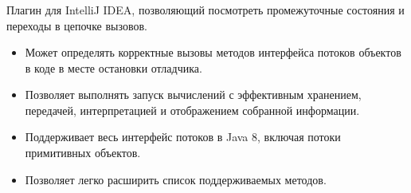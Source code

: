 \begin{frame}
\frametitle{\insertsection} 
\framesubtitle{\insertsubsection}
Плагин для IntelliJ IDEA, позволяющий посмотреть промежуточные состояния и переходы в цепочке вызовов. 
\begin{itemize}
	\item Может определять корректные вызовы методов интерфейса потоков объектов в коде в месте остановки отладчика.
	\item Позволяет выполнять запуск вычислений с эффективным хранением, передачей, интерпретацией и отображением собранной информации.
	\item Поддерживает весь интерфейс потоков в Java 8, включая потоки примитивных объектов.
	\item Позволяет легко расширить список поддерживаемых методов.
\end{itemize}
\end{frame}
 